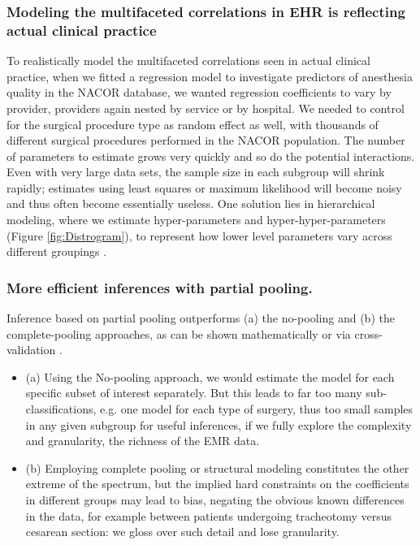 \documentclass[11pt,notitlepage]{article}
\begin{document}
\subsubsection*{Modeling the multifaceted correlations in EHR is reflecting actual clinical practice}
To realistically model the multifaceted correlations seen in actual clinical practice, when we fitted a regression model to investigate predictors of anesthesia quality in the NACOR database, we wanted regression coefficients to vary by provider, providers again nested by service or by hospital\cite{AndreaeWhite2015}. We needed to control for the surgical procedure type as random effect as well, with thousands of different surgical procedures performed in the NACOR population. The number of parameters to estimate grows very quickly and so do the potential interactions. Even with very large data sets, the sample size in each subgroup will shrink rapidly; estimates using least squares or maximum likelihood will become noisy and thus often become essentially useless. One solution lies in hierarchical modeling, where we estimate hyper-parameters and hyper-hyper-parameters (Figure \ref{fig:Distrogram}), to represent how lower level parameters vary across different groupings \cite{Bafumi2007}.

\subsubsection*{More efficient inferences with partial pooling.}
Inference based on partial pooling outperforms (a) the no-pooling and (b) the complete-pooling approaches, as can be shown mathematically \cite{Efron_1975} or via cross-validation \cite{Gelman2014}.  

\begin{itemize}

\item (a) Using the No-pooling approach, we would estimate the model for each specific subset of interest separately. But this leads to far too many sub-classifications, e.g. one model for each type of surgery, thus too small samples in any given subgroup for useful inferences, if we fully explore the complexity and granularity, the richness of the EMR data. 
\item (b) Employing complete pooling or structural modeling constitutes the other extreme of the spectrum, but the implied hard constraints on the coefficients in different groups may lead to bias, negating the obvious known differences in the data, for example between patients undergoing tracheotomy versus cesarean section: we gloss over such detail and lose granularity. 
\end{itemize}
\end{document}
